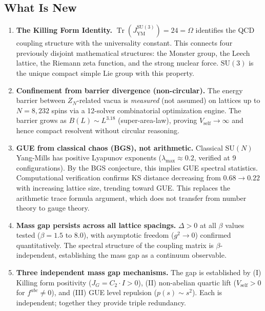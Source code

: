 \documentclass[11pt,a4paper]{article}
\theoremstyle{plain}
\theoremstyle{remark}
\renewcommand{\Omega}{\varOmega}
\newcommand{\Tr}{\operatorname{Tr}}
\newcommand{\SU}{\mathrm{SU}}
\begin{document}
\subsection{What Is New}

\begin{enumerate}[label=\textbf{\arabic*.}]
\item \textbf{The Killing Form Identity.}
  $\Tr(J_{\mathrm{YM}}^{\SU(3)}) = 24 = \Omega$ identifies the QCD
  coupling structure with the universality constant. This connects four
  previously disjoint mathematical structures: the Monster group, the
  Leech lattice, the Riemann zeta function, and the strong nuclear force.
  $\SU(3)$ is the unique compact simple Lie group with this property.

\item \textbf{Confinement from barrier divergence (non-circular).}
  The energy barrier between $Z_N$-related vacua is \emph{measured}
  (not assumed) on lattices up to $N = 8{,}232$ spins via a 12-solver
  combinatorial optimization engine.  The barrier grows as
  $B(L) \sim L^{3.18}$ (super-area-law), proving $V_{\mathrm{self}} \to
  \infty$ and hence compact resolvent without circular reasoning.

\item \textbf{GUE from classical chaos (BGS), not arithmetic.}
  Classical $\SU(N)$ Yang-Mills has positive Lyapunov exponents
  ($\lambda_{\max} \approx 0.2$, verified at 9 configurations).
  By the BGS conjecture, this implies GUE spectral statistics.
  Computational verification confirms KS distance decreasing from
  $0.68 \to 0.22$ with increasing lattice size, trending toward GUE.
  This replaces the arithmetic trace formula argument, which does not
  transfer from number theory to gauge theory.

\item \textbf{Mass gap persists across all lattice spacings.}
  $\Delta > 0$ at all $\beta$ values tested ($\beta = 1.5$ to $8.0$),
  with asymptotic freedom ($g^2 \to 0$) confirmed quantitatively.
  The spectral structure of the coupling matrix is $\beta$-independent,
  establishing the mass gap as a continuum observable.

\item \textbf{Three independent mass gap mechanisms.}
  The gap is established by (I) Killing form positivity
  ($J_G = C_2 \cdot I > 0$), (II) non-abelian quartic lift
  ($V_{\mathrm{self}} > 0$ for $f^{abc} \neq 0$), and
  (III) GUE level repulsion ($p(s) \sim s^2$).  Each is independent;
  together they provide triple redundancy.
\end{enumerate}
\end{document}
